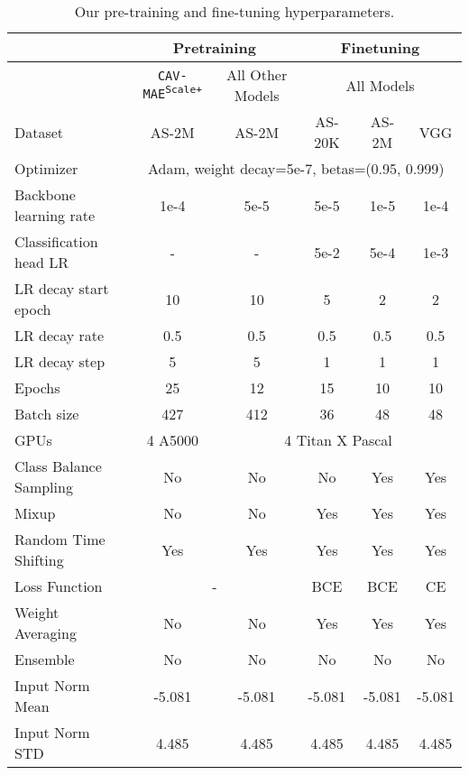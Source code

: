\documentclass{article} \usepackage{iclr2023_conference,times}
\begin{document}
\begin{table}[h]
\centering
\caption{Our pre-training and fine-tuning hyperparameters.}
\label{tab:hyperpar}
\begin{tabular}{@{}lccccc@{}}
\toprule
                       & \multicolumn{2}{c}{Pretraining} & \multicolumn{3}{c}{Finetuning} \\ \midrule
                       & \texttt{CAV-MAE\textsuperscript{Scale+}}    & All Other Models   & \multicolumn{3}{c}{All Models} \\ \cmidrule(l){2-6} 
Dataset                & AS-2M      & AS-2M              & AS-20K   & AS-2M   & VGG  \\
Optimizer              & \multicolumn{5}{c}{Adam, weight decay=5e-7, betas=(0.95, 0.999)} \\
Backbone learning rate & 1e-4       & 5e-5               & 5e-5     & 1e-5    & 1e-4      \\
Classification head LR & -          & -                  & 5e-2     & 5e-4    & 1e-3      \\
LR decay start epoch   & 10         & 10                 & 5        & 2       & 2         \\
LR decay rate          & 0.5        & 0.5                & 0.5      & 0.5     & 0.5       \\
LR decay step          & 5          & 5                  & 1        & 1       & 1         \\
Epochs                 & 25         & 12                 & 15       & 10      & 10        \\
Batch size             & 427       & 412               & 36       & 48      & 48        \\
GPUs                   & 4 A5000    & \multicolumn{4}{c}{4  Titan X Pascal}               \\
Class Balance Sampling & No         & No                 & No       & Yes     & Yes       \\
Mixup                  & No         & No                 & Yes      & Yes     & Yes       \\
Random Time Shifting   & Yes        & Yes                & Yes      & Yes     & Yes       \\
Loss Function          & \multicolumn{2}{c}{-}           & BCE      & BCE     & CE        \\
Weight Averaging       & No         & No                 & Yes      & Yes     & Yes       \\
Ensemble               & No         & No                 & No       & No      & No        \\
Input Norm Mean        & -5.081     & -5.081             & -5.081   & -5.081  & -5.081    \\
Input Norm STD         & 4.485      & 4.485              & 4.485    & 4.485   & 4.485     \\ \bottomrule
\end{tabular}
\end{table}
\end{document}
